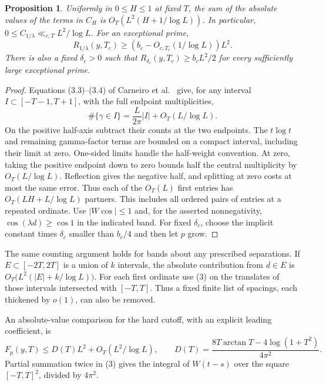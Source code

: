 \documentclass[11pt]{article}
\newtheorem{proposition}{Proposition}
\begin{document}
\begin{proposition}
Uniformly in $0\le H\le1$ at fixed $T$, the sum of the absolute values
of the terms in $C_H$ is $O_T(L^2(H+1/\log L))$. In particular,
$0\le C_{1/\lambda}\ll_{c,T} L^2/\log L$. For an exceptional prime,
\[
 R_{1/\lambda}(y,T_c)\ge (b_c-O_{c,T_c}(1/\log L))L^2 .
 \tag{2}
\]
There is also a fixed $\delta_c>0$ such that
$R_{\delta_c}(y,T_c)\ge b_cL^2/2$ for every sufficiently large
exceptional prime.
\end{proposition}
\begin{proof}
Equations (3.3)--(3.4) of Carneiro et al.\ \cite{cmqr} give, for any
interval $I\subset[-T-1,T+1]$, with the full endpoint multiplicities,
\[
  \#\{\gamma\in I\}=\frac{L}{2\pi}|I|+O_T(L/\log L).
  \tag{3}
\]
On the positive half-axis subtract their counts at the two endpoints.
The $t\log t$ and remaining gamma-factor terms are bounded on a compact
interval, including their limit at zero. One-sided limits handle the
half-weight convention. At zero, taking the positive endpoint down
to zero bounds half the central multiplicity by $O_T(L/\log L)$.
Reflection gives the negative half, and splitting at zero costs at
most the same error. Thus each of the $O_T(L)$ first entries has
$O_T(LH+L/\log L)$ partners. This includes all ordered pairs of entries
at a repeated ordinate. Use $|W\cos|\le1$ and, for the asserted
nonnegativity, $\cos(\lambda d)\ge\cos 1$ in the indicated band.
For fixed $\delta_c$, choose the implicit constant times $\delta_c$
smaller than $b_c/4$ and then let $p$ grow.
\end{proof}
The same counting argument holds for bands about any prescribed
separations. If $E\subset[-2T,2T]$ is a union of $k$ intervals, the
absolute contribution from $d\in E$ is
$O_T\big(L^2(|E|+k/\log L)\big)$. For each first ordinate use (3)
on the translates of those intervals intersected with $[-T,T]$.
Thus a fixed finite list of spacings, each thickened by $o(1)$, can
also be removed.

An absolute-value comparison for the hard cutoff, with an explicit
leading coefficient, is
\[
 F_p(y,T)\le D(T)L^2+O_T(L^2/\log L),\qquad
 D(T)=\frac{8T\arctan T-4\log(1+T^2)}{4\pi^2}.
 \tag{4}
\]
Partial summation twice in (3) gives the integral of $W(t-s)$
over the square $[-T,T]^2$, divided by $4\pi^2$.
\end{document}
